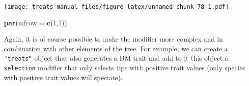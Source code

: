 \documentclass[
]{book}
\newenvironment{Shaded}{\begin{snugshade}}{\end{snugshade}}
\newcommand{\DataTypeTok}[1]{\textcolor[rgb]{0.13,0.29,0.53}{#1}}
\newcommand{\DecValTok}[1]{\textcolor[rgb]{0.00,0.00,0.81}{#1}}
\newcommand{\KeywordTok}[1]{\textcolor[rgb]{0.13,0.29,0.53}{\textbf{#1}}}
\newcommand{\NormalTok}[1]{#1}
\begin{document}
\texttt{[image: treats\_manual\_files/figure-latex/unnamed-chunk-78-1.pdf]}

\begin{Shaded}
\begin{Highlighting}[]
\KeywordTok{par}\NormalTok{(}\DataTypeTok{mfrow =} \KeywordTok{c}\NormalTok{(}\DecValTok{1}\NormalTok{,}\DecValTok{1}\NormalTok{))}
\end{Highlighting}
\end{Shaded}

Again, it is of course possible to make the modifier more complex and in combination with other elements of the tree.
For example, we can create a \texttt{"treats"} object that also generates a BM trait and add to it this object a \texttt{selection} modifier that only selects tips with positive trait values (only species with positive trait values will speciate).
\end{document}
